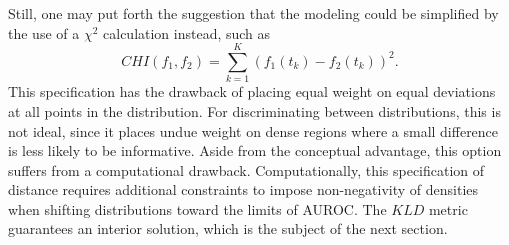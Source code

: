 





Still, one may put forth the suggestion that the modeling could be simplified by the use of a $\chi^2$ calculation instead, such as
%
%
\begin{equation}
    CHI(f_1, f_2) = \sum_{k = 1}^{K} \left( f_1(t_k) - f_2(t_k) \right)^2.
\end{equation}
%
This specification has the drawback of placing equal weight on equal deviations at all points in the distribution.
For discriminating between distributions, this is not ideal, since it places undue weight on dense regions where a small difference is less likely to be informative.
%
Aside from the conceptual advantage, this option suffers from a computational drawback.
Computationally, this specification of distance requires additional constraints to impose non-negativity of densities when shifting distributions toward the limits of AUROC.
The $KLD$ metric guarantees an interior solution, which is the subject of the next section.





